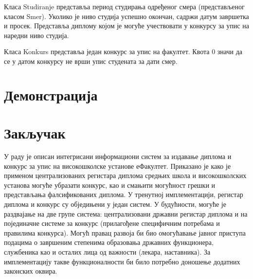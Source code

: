 \documentclass[a4paper]{article}
\begin{document}
Класа Studiranje представља период студирања одређеног смера (представљеног класом Smer). Уколико је ниво студија
успешно окончан, садржи датум завршетка и просек. Представља диплому којом је могуће учествовати у конкурсу за упис
на наредни ниво студија.

Класа Konkurs представља један конкурс за упис на факултет. Квота 0 значи да се у датом конкурсу не врши упис студената за дати смер.

\section*{Демонстрација}

\section*{Закључак}

У раду је описан интегрисани информациони систем за издавање диплома и конкурс за упис на високошколске установе еФакултет.
Приказано је како је применом централизованих регистара диплома средњих школа и високошколских установа могуће убразати
конкурс, као и смањити могућност грешки и представљања фалсификованих диплома. У тренутној имплементацији, регистар диплома
и конкурс су обједињени у један систем. У будућности, могуће је раздвајање на две групе система:
централизовани државни регистар диплома и на појединачне системе за конкурс (прилагођене специфичним потребама и
правилима конкурса). Могућ правац развоја би био омогућавање јавног приступа подацима о завршеним степенима образовања
државних функционера, службеника као и осталих лица од важности (лекара, наставника). За имплементацију такве функционалности
би било потребно доношење додатних законских оквира.



\end{document}
